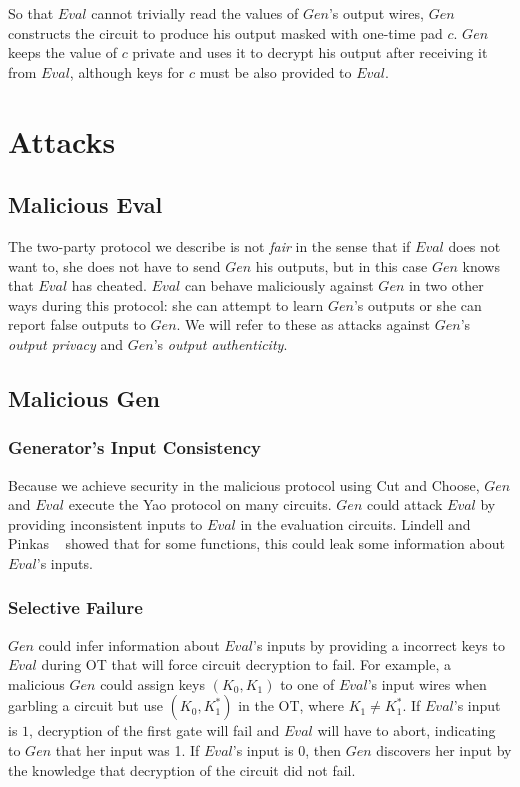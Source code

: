 \documentclass{article}
\begin{document}
So that $Eval$ cannot trivially read the values of $Gen$'s output wires, $Gen$ constructs the circuit to produce his output masked with one-time pad $c$. $Gen$ keeps the value of $c$ private and uses it to decrypt his output after receiving it from $Eval$, although keys for $c$ must be also provided to $Eval$.

\section{Attacks}

\subsection{Malicious Eval}
The two-party protocol we describe is not {\it fair} in the sense that if $Eval$ does not want to, she does not have to send $Gen$ his outputs, but in this case $Gen$ knows that $Eval$ has cheated. $Eval$ can behave maliciously against $Gen$ in two other ways during this protocol: she can attempt to learn $Gen$'s outputs or she can report false outputs to $Gen$. We will refer to these as attacks against $Gen$'s \emph{output privacy} and $Gen$'s \emph{output authenticity}.\\

\subsection{Malicious Gen}

\subsubsection{Generator's Input Consistency} 

Because we achieve security in the malicious protocol using Cut and Choose, $Gen$ and $Eval$ execute the Yao protocol on many circuits. $Gen$ could attack $Eval$ by providing inconsistent inputs to $Eval$ in the evaluation circuits. Lindell and Pinkas ~\cite{LP07} showed that for some functions, this could leak some information about $Eval$'s inputs.

\subsubsection{Selective Failure}

$Gen$ could infer information about $Eval$'s inputs by providing a incorrect keys to $Eval$ during OT that will force circuit decryption to fail. For example, a malicious $Gen$ could assign keys $(K_0,K_1)$ to one of $Eval$'s input wires when garbling a circuit but use $(K_0,K_{1}^{*})$ in the OT, where $K_{1} \neq K_{1}^{*}$. If $Eval$'s input is $1$, decryption of the first gate will fail and $Eval$ will have to abort, indicating to $Gen$ that her input was 1. If $Eval$'s input is 0, then $Gen$ discovers her input by the knowledge that decryption of the circuit did not fail.
\end{document}
